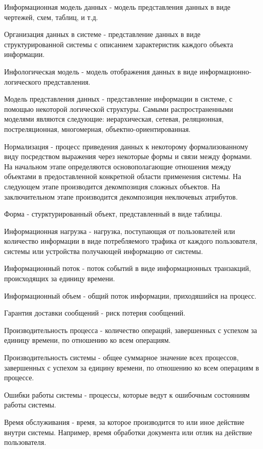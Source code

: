 Информационная модель данных - модель представления данных в виде чертежей, схем, таблиц, и т.д.

Организация данных в системе - представление данных в виде структурированной системы с описанием характеристик каждого объекта информации.

Инфологическая модель - модель отображения данных в виде информационно-логического представления.

Модель представления данных - представление информации в системе, с помощью некоторой логической структуры. Самыми распространенными моделями являются следующие: иерархическая, сетевая, реляционная,  постреляционная, многомерная, объектно-ориентированная.

Нормализация - процесс приведения данных к некоторому формализованному виду посредством выражения через некоторые формы и связи между формами. На начальном этапе определяются основополагающие отношения между объектами в предоставленной конкретной области применения системы. На следующем этапе производится декомпозиция сложных объектов. На заключительном этапе  производится декомпозиция неключевых атрибутов.

Форма - стурктурированный объект, представленный в виде таблицы.

Информационная нагрузка - нагрузка, поступающая от пользователей или количество информации в виде потребляемого трафика от каждого пользователя, системы или устройства получающей информацию от системы. 
 
Информационный поток - поток событий в виде информационных транзакций, происходящих за единицу времени.

Информационный объем - общий поток информации, приходяшийся на процесс.

Гарантия доставки сообщений - риск потерия сообщений.

Производительность процесса - количество операций, завершенных с успехом за единицу времени, по отношению ко всем операциям.

Производительность системы - общее суммарное значение всех процессов, завершенных с успехом за едицину времени, по отношению ко всем операциям в процессе.

Ошибки работы системы - процессы, которые ведут к ошибочным состояниям работы системы.

Время обслуживания - время, за которое производится то или иное действие внутри системы. Например, время обработки документа или отлик на действие пользователя. 

